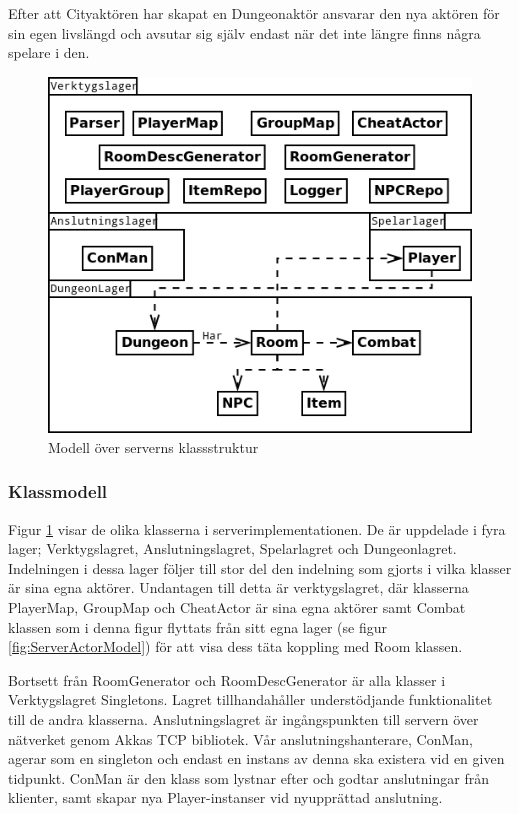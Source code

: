 \documentclass[a4paper]{article}
\begin{document}
Efter att Cityaktören har skapat en Dungeonaktör ansvarar den nya aktören för sin egen livslängd och avsutar sig själv endast när det inte längre finns några spelare i den.

\begin{figure}[hbt]
\centering
\includegraphics[width=1.0\textwidth]{serverUml2}
\caption{\label{fig:ServerKlassModell}Modell över serverns klassstruktur}
\end{figure}

\subsubsection{Klassmodell}
Figur \ref{fig:ServerKlassModell} visar de olika klasserna i serverimplementationen.
De är uppdelade i fyra lager; Verktygslagret, Anslutningslagret, Spelarlagret och Dungeonlagret. Indelningen i dessa lager följer till stor del
den indelning som gjorts i vilka klasser är sina egna aktörer. Undantagen till detta är verktygslagret, där klasserna PlayerMap, GroupMap och CheatActor är sina egna aktörer samt 
Combat klassen som i denna figur flyttats från sitt egna lager (se figur \ref{fig:ServerActorModel}) för att visa dess täta koppling med Room klassen.

Bortsett från RoomGenerator och RoomDescGenerator är alla klasser i Verktygslagret Singletons. Lagret tillhandahåller  understödjande funktionalitet till de andra klasserna.
Anslutningslagret är ingångspunkten till servern över nätverket genom Akkas TCP bibliotek. Vår anslutningshanterare, ConMan, agerar som en singleton och endast en 
instans av denna ska existera vid en given tidpunkt. ConMan är den klass som lystnar efter och godtar anslutningar från klienter, samt skapar nya Player-instanser vid nyupprättad anslutning.
\end{document}

